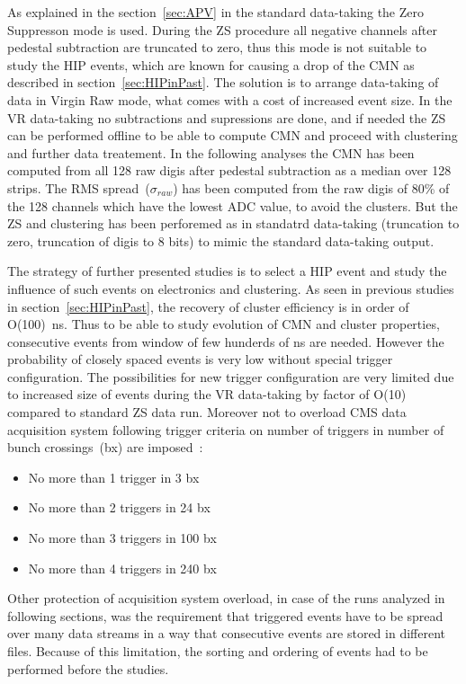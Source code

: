 As explained in the section~\ref{sec:APV} in the standard data-taking the Zero Suppresson mode is used. During the ZS procedure all negative channels after pedestal subtraction are truncated to zero, thus this mode is not suitable to study the HIP events, which are known for causing a drop of the CMN as described in section~\ref{sec:HIPinPast}. The solution is to arrange data-taking of data in Virgin Raw mode, what comes with a cost of increased event size. In the VR data-taking no subtractions and supressions are done, and if needed the ZS can be performed offline to be able to compute CMN and proceed with clustering and further data treatement. In the following analyses the CMN has been computed from all 128 raw digis after pedestal subtraction as a median over 128 strips. The RMS spread~($\sigma_{raw}$) has been computed from the raw digis of 80\% of the 128 channels which have the lowest ADC value, to avoid the clusters. But the ZS and clustering has been perforemed as in standatrd data-taking (truncation to zero, truncation of digis to 8 bits) to mimic the standard data-taking output.

The strategy of further presented studies is to select a HIP event and study the influence of such events on electronics and clustering. As seen in previous studies in section~\ref{sec:HIPinPast}, the recovery of cluster efficiency is in order of O(100)~ns. Thus to be able to study evolution of CMN and cluster properties, consecutive events from window of few hunderds of ns are needed. However the probability of closely spaced events is very low without special trigger configuration. The possibilities for new trigger configuration are very limited due to increased size of events during the VR data-taking by factor of O(10) compared to standard ZS data run. Moreover not to overload CMS data acquisition system following trigger criteria on number of triggers in number of bunch crossings~(bx) are imposed~\cite{website:VRtrigger}:

\begin{itemize}
\item{No more than 1 trigger in 3 bx}
\item{No more than 2 triggers in 24 bx}
\item{No more than 3 triggers in 100 bx}
\item{No more than 4 triggers in 240 bx}
\end{itemize}

Other protection of acquisition system overload, in case of the runs analyzed in following sections, was the requirement that triggered events have to be spread over many data streams in a way that consecutive events are stored in different files. Because of this limitation, the sorting and ordering of events had to be performed before the studies.

